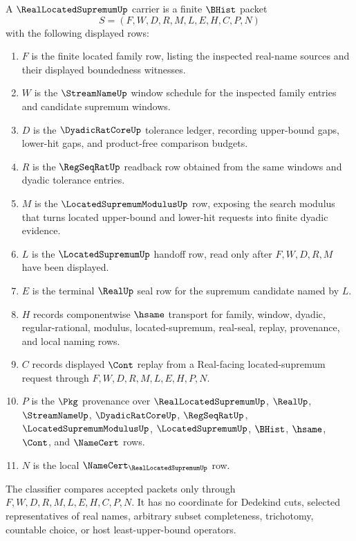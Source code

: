 \begin{definition}
\label{def:real-located-supremum-carrier}
A $\RealLocatedSupremumUp$ carrier is a finite $\BHist$ packet
$$
S=(F,W,D,R,M,L,E,H,C,P,N)
$$
with the following displayed rows:
\begin{enumerate}
\item $F$ is the finite located family row, listing the inspected real-name sources and their displayed boundedness witnesses.
\item $W$ is the $\StreamNameUp$ window schedule for the inspected family entries and candidate supremum windows.
\item $D$ is the $\DyadicRatCoreUp$ tolerance ledger, recording upper-bound gaps, lower-hit gaps, and product-free comparison budgets.
\item $R$ is the $\RegSeqRatUp$ readback row obtained from the same windows and dyadic tolerance entries.
\item $M$ is the $\LocatedSupremumModulusUp$ row, exposing the search modulus that turns located upper-bound and lower-hit requests into finite dyadic evidence.
\item $L$ is the $\LocatedSupremumUp$ handoff row, read only after $F,W,D,R,M$ have been displayed.
\item $E$ is the terminal $\RealUp$ seal row for the supremum candidate named by $L$.
\item $H$ records componentwise $\hsame$ transport for family, window, dyadic, regular-rational, modulus, located-supremum, real-seal, replay, provenance, and local naming rows.
\item $C$ records displayed $\Cont$ replay from a Real-facing located-supremum request through $F,W,D,R,M,L,E,H,P,N$.
\item $P$ is the $\Pkg$ provenance over $\RealLocatedSupremumUp$, $\RealUp$, $\StreamNameUp$, $\DyadicRatCoreUp$, $\RegSeqRatUp$, $\LocatedSupremumModulusUp$, $\LocatedSupremumUp$, $\BHist$, $\hsame$, $\Cont$, and $\NameCert$ rows.
\item $N$ is the local $\NameCert_{\RealLocatedSupremumUp}$ row.
\end{enumerate}
The classifier compares accepted packets only through $F,W,D,R,M,L,E,H,C,P,N$. It has no coordinate for Dedekind cuts, selected representatives of real names, arbitrary subset completeness, trichotomy, countable choice, or host least-upper-bound operators.
\end{definition}

